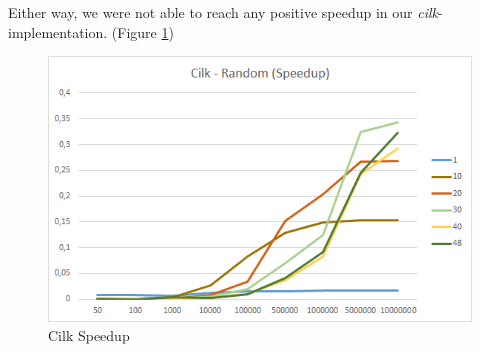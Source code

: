 \documentclass[12pt,a4paper,titlepage,oneside]{scrartcl}
\begin{document}
Either way, we were not able to reach any positive speedup in our \textit{cilk}-implementation. (Figure \ref{fig:saturn_cilk_speedup_random})

\begin{figure}[h]
\includegraphics[width=\linewidth]{Saturn_Cilk_Speedup_Random}
\caption{Cilk Speedup}
\label{fig:saturn_cilk_speedup_random}
\end{figure}


%
%
\end{document}
